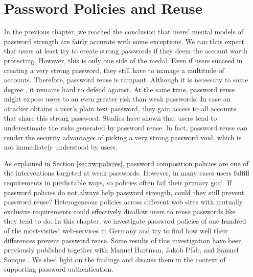 \chapter[Password Policies and Reuse]{Password Policies and Reuse}\label{chap:policies_reuse}
In the previous chapter, we reached the conclusion that users' mental models of password strength are fairly accurate with some exceptions. We can thus expect that users at least try to create strong passwords if they deem the account worth protecting. 
However, this is only one side of the medal: Even if users succeed in creating a very strong password, they still have to manage a multitude of accounts. Therefore, password reuse is rampant. Although it is necessary to some degree \cite{Florencio2014PasswordPortfoliosFiniteUser, ZhangKennedy2016RevisitingPasswordRules}, it remains hard to defend against.  At the same time, password reuse might expose users to an even greater risk than weak passwords.  In case an attacker obtains a user's plain text password, they gain access to all accounts that share this strong password. Studies have shown that users tend to underestimate the risks generated by password reuse. In fact, password reuse can render the security advantages of picking a very strong password void, which is not immediately understood by users.

As explained in Section \ref{sec:rw:policies}, password composition policies are one of the interventions targeted at weak passwords. However, in many cases users fulfill requirements in predictable ways, so policies often fail their primary goal. If password policies do not always help password strength, could they still prevent password reuse? Heterogeneous policies across different web sites with mutually exclusive requirements could effectively disallow users to reuse passwords like they tend to do. In this chapter, we investigate password policies of one hundred of the most-visited web-services in Germany and try to find how well their differences prevent password reuse. Some results of this investigation have been previously published together with Manuel Hartman, Jakob Pfab, and Samuel Souque \cite{Seitz2017PoliciesReuse}. We shed light on the findings and discuss them in the context of supporting password authentication. 

